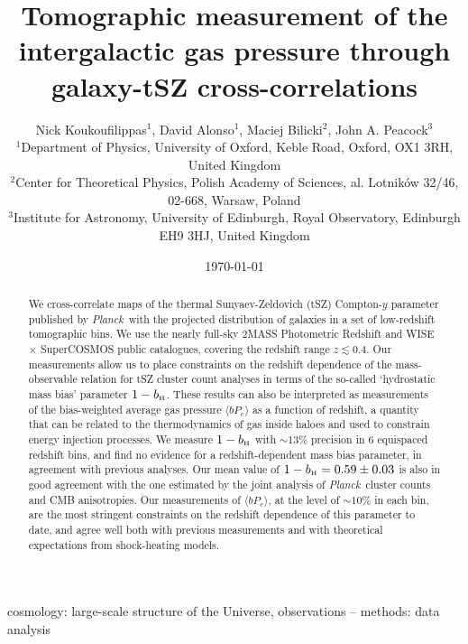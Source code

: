 \documentclass[useAMS,usenatbib]{mn2e}
\title[Tomographic measurement of the intergalactic gas pressure through galaxy-tSZ cross-correlations]{Tomographic measurement of the intergalactic gas pressure through galaxy-tSZ cross-correlations}
\author[Koukoufilippas et al.]{Nick Koukoufilippas$^1$, David Alonso$^1$, Maciej Bilicki$^2$, John A. Peacock$^3$\\
                      $^{1}$Department of Physics, University of Oxford, Keble Road, Oxford, OX1 3RH, United Kingdom\\
                      $^{2}$Center for Theoretical Physics, Polish Academy of Sciences, al. Lotnik\'ow 32/46, 02-668, Warsaw, Poland\\
                      $^{3}$Institute for Astronomy, University of Edinburgh, Royal Observatory, Edinburgh EH9 3HJ, United Kingdom
                      }
\def\bH{b_{\scriptscriptstyle\rm H}}
\def\planck{{\it Planck\/}}
\begin{document}
  \date{\today}
   
  \maketitle

\begin{abstract}
    We cross-correlate maps of the thermal Sunyaev-Zeldovich (tSZ) Compton-$y$ parameter published by \planck\ with the projected distribution of galaxies in a set of low-redshift tomographic bins. We use the nearly full-sky 2MASS Photometric Redshift and WISE $\times$ SuperCOSMOS public catalogues, covering the redshift range $z\lesssim0.4$. Our measurements allow us to place constraints on the redshift dependence of the mass-observable relation for tSZ cluster count analyses in terms of the so-called `hydrostatic mass bias' parameter $1-\bH$. These results can also be interpreted as measurements of the bias-weighted average gas pressure $\langle bP_e\rangle$ as a function of redshift, a quantity that can be related to the thermodynamics of gas inside haloes and used to constrain energy injection processes. We measure $1-\bH$ with $\sim13\%$ precision in 6 equispaced redshift bins, and find no evidence for a redshift-dependent mass bias parameter, in agreement with previous analyses. Our mean value of $1-\bH = 0.59\pm0.03$ is also in good agreement with the one estimated by the joint analysis of \planck\ cluster counts and CMB anisotropies. Our measurements of $\langle bP_e\rangle$, at the level of $\sim10\%$ in each bin, are the most stringent constraints on the redshift dependence of this parameter to date, and agree well both with previous measurements and with theoretical expectations from shock-heating models.
\end{abstract}

\begin{keywords}
  cosmology: large-scale structure of the Universe, observations -- methods: data analysis
\end{keywords}
\end{document}

